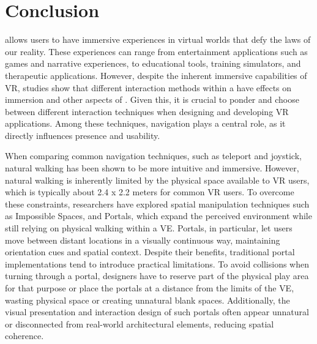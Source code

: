 
%

\chapter{Conclusion}
\label{cha:conclusion}

 allows users to have immersive experiences in virtual worlds that defy the laws of our reality. 
These experiences can range from entertainment applications such as games and narrative experiences, to educational tools, training simulators, 
and therapeutic applications.
However, despite the inherent immersive capabilities of \gls{VR}, studies show that different interaction methods within a  have 
effects on immersion and other aspects of . Given this, it is crucial to ponder and choose between different interaction techniques 
when designing and developing \gls{VR} applications. Among these techniques, navigation plays a central role, 
as it directly influences presence and usability.

When comparing common navigation techniques, such as teleport and joystick, natural walking has been
shown to be more intuitive and immersive. However, natural walking is inherently limited by the physical space
available to \gls{VR} users, which is typically about 2.4 x 2.2 meters for common \gls{VR} users.
To overcome these constraints, researchers have explored spatial manipulation techniques such as Impossible Spaces, 
and Portals, which expand the perceived environment while still relying on physical walking within a \gls{VE}.
Portals, in particular, let users move between distant locations in a visually continuous way, maintaining orientation cues and
spatial context. Despite their benefits, traditional portal implementations tend to
introduce practical limitations. To avoid collisions when turning through a portal, designers have to reserve part of the physical play
area for that purpose or place the portals at a distance from the limits of the \gls{VE}, wasting physical space or
creating unnatural blank spaces. Additionally, the visual presentation and interaction design of such portals often appear unnatural
or disconnected from real-world architectural elements, reducing spatial coherence.

